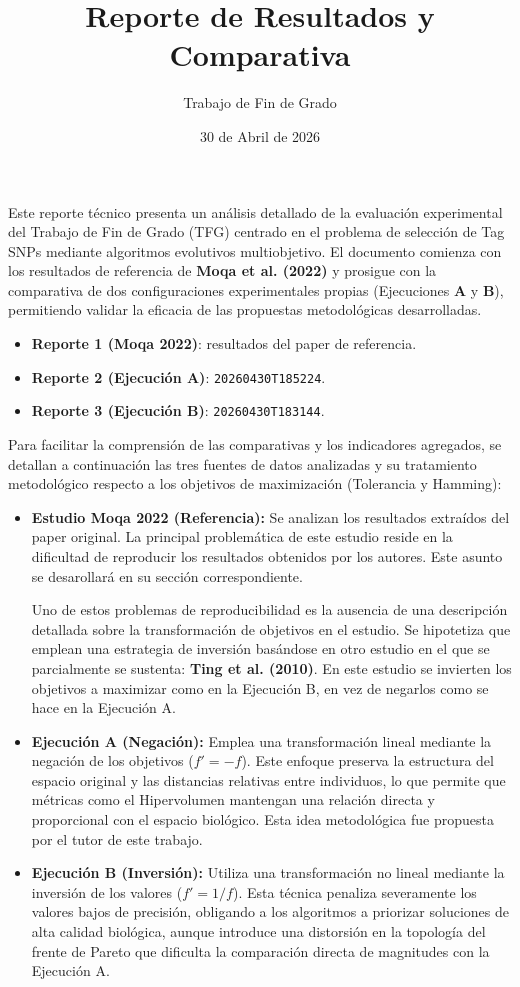 \documentclass[a4paper,10pt]{article}
\title{Reporte de Resultados y Comparativa}
\author{Trabajo de Fin de Grado}
\date{30 de Abril de 2026}
\begin{document}
\maketitle

Este reporte técnico presenta un análisis detallado de la evaluación experimental del Trabajo de Fin de Grado (TFG) centrado en el problema de selección de Tag SNPs mediante algoritmos evolutivos multiobjetivo. El documento comienza con los resultados de referencia de \textbf{Moqa et al. (2022)} y prosigue con la comparativa de dos configuraciones experimentales propias (Ejecuciones \textbf{A} y \textbf{B}), permitiendo validar la eficacia de las propuestas metodológicas desarrolladas.

\begin{itemize}
    \item \textbf{Reporte 1 (Moqa 2022)}: resultados del paper de referencia.
    \item \textbf{Reporte 2 (Ejecución A)}: \texttt{20260430T185224}.
    \item \textbf{Reporte 3 (Ejecución B)}: \texttt{20260430T183144}.
\end{itemize}

Para facilitar la comprensión de las comparativas y los indicadores agregados, se detallan a continuación las tres fuentes de datos analizadas y su tratamiento metodológico respecto a los objetivos de maximización (Tolerancia y Hamming):

\begin{itemize}
    \item \textbf{Estudio Moqa 2022 (Referencia):} Se analizan los resultados extraídos del paper original. La principal problemática de este estudio reside en la dificultad de reproducir los resultados obtenidos por los autores. Este asunto se desarollará en su sección correspondiente. 
    
    Uno de estos problemas de reproducibilidad es la ausencia de una descripción detallada sobre la transformación de objetivos en el estudio. Se hipotetiza que emplean una estrategia de inversión basándose en otro estudio en el que se parcialmente se sustenta: \textbf{Ting et al. (2010)}. En este estudio se invierten los objetivos a maximizar como en la Ejecución B, en vez de negarlos como se hace en la Ejecución A.
    \item \textbf{Ejecución A (Negación):} Emplea una transformación lineal mediante la negación de los objetivos ($f' = -f$). Este enfoque preserva la estructura del espacio original y las distancias relativas entre individuos, lo que permite que métricas como el Hipervolumen mantengan una relación directa y proporcional con el espacio biológico. Esta idea metodológica fue propuesta por el tutor de este trabajo.
    \item \textbf{Ejecución B (Inversión):} Utiliza una transformación no lineal mediante la inversión de los valores ($f' = 1/f$). Esta técnica penaliza severamente los valores bajos de precisión, obligando a los algoritmos a priorizar soluciones de alta calidad biológica, aunque introduce una distorsión en la topología del frente de Pareto que dificulta la comparación directa de magnitudes con la Ejecución A.
\end{itemize}
\end{document}
